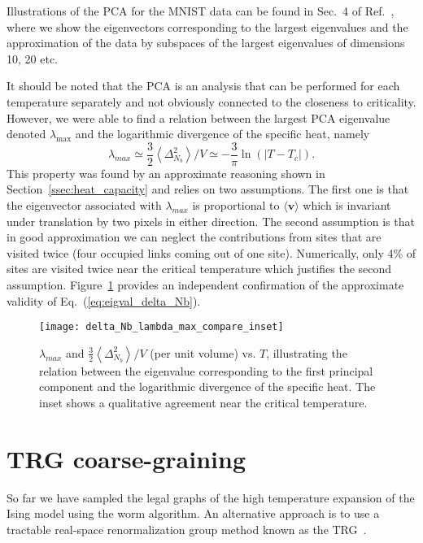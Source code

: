\documentclass[../main.tex]{subfiles}
\begin{document}
Illustrations of the PCA for the MNIST data can be found in Sec.~4 of
Ref.~\cite{foreman2017}, where we show the eigenvectors corresponding to the
largest eigenvalues and the approximation of the data by subspaces of the
largest eigenvalues of dimensions 10, 20 etc. 

It should be noted that the PCA is an analysis that can be performed for each
temperature separately and not obviously connected to the closeness to
criticality.
%
However, we were able to find a relation between the largest PCA eigenvalue
denoted $\lambda_{\max}$ and the logarithmic divergence of the specific heat,
namely
%
\begin{equation}
    \lambda_{max} \simeq \frac{3}{2}\left \langle \Delta_{N_b}^2
    \right\rangle/V\simeq -\frac{3}{\pi}\ln(|T-T_c|).
    \label{eq:eigval_delta_Nb}
\end{equation}
%
This property was found by an approximate reasoning shown in
Section~\ref{ssec:heat_capacity} and relies on two assumptions.
%
The first one is that the eigenvector associated with $\lambda_{max}$ is
proportional to $\langle \mathbf{v}\rangle$ which is invariant under
translation by two pixels in either direction.
%
The second assumption is that in good approximation we can neglect the
contributions from sites that are visited twice (four occupied links coming out
of one site).
%
Numerically, only 4\% of sites are visited twice near the critical temperature
which justifies the second assumption.
Figure~\ref{fig:eigval_fluctuations_unblocked} provides an independent
confirmation of the approximate validity of Eq.~(\ref{eq:eigval_delta_Nb}). 
%
\begin{figure}[htpb]
 \centering
 \texttt{[image: delta\_Nb\_lambda\_max\_compare\_inset]}
	\hfill
 \caption{$\lambda_{max}$ and $\frac{3}{2}\left \langle \Delta_{N_b}^2
		\right\rangle / V$ (per unit volume) vs. $T$, illustrating the relation
		between the eigenvalue corresponding to the first principal component and
		the logarithmic divergence of the specific heat. The inset shows a
		qualitative agreement near the critical temperature.}%
 \label{fig:eigval_fluctuations_unblocked}
\end{figure}
%
\section{TRG coarse-graining}%
\label{sec:trg}
So far we  have sampled the legal graphs of the high temperature expansion of
the Ising model using the worm algorithm.
%
An alternative approach is to use a tractable real-space renormalization group
method known as the TRG~\cite{PhysRevB.86.045139,prb87,prd88,prd89,pre89}. 
\end{document}
